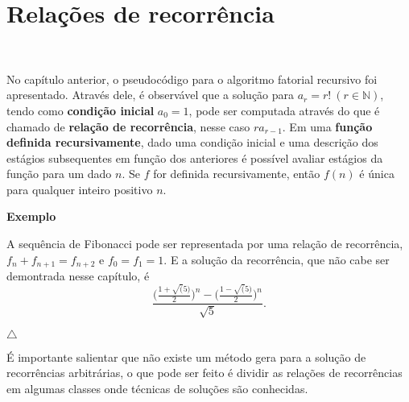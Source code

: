 \section{Relações de recorrência}
\

No capítulo anterior, o pseudocódigo para o algoritmo fatorial recursivo foi apresentado. Através dele, é observável que a solução para $a_r = r! \ (r \in \mathbb{N})$, tendo como \textbf{condição inicial} $a_0 = 1$, pode ser computada através do que é chamado de \textbf{relação de recorrência}, nesse caso $ra_{r-1}$. Em uma \textbf{função definida recursivamente}, dado uma condição inicial e uma descrição dos estágios subsequentes em função dos anteriores é possível avaliar estágios da função para um dado $n$. Se $f$ for definida recursivamente, então $f(n)$ é única para qualquer inteiro positivo $n$.

\textbf{Exemplo}

A sequência de Fibonacci pode ser representada por uma relação de recorrência, $f_{n}+f_{n+1}=f_{n+2}$ e $f_0=f_1=1$. E a solução da recorrência, que não cabe ser demontrada nesse capítulo, é
\[\frac{\Bigr(\frac{1+\sqrt(5)}{2}\Bigr)^n-\Bigr(\frac{1-\sqrt(5)}{2}\Bigr)^n}{\sqrt{5}}.\]

{\raggedleft $\bigtriangleup$ \par}

É importante salientar que não existe um método gera para a solução de recorrências arbitrárias, o que pode ser feito é dividir as relações de recorrências em algumas classes onde técnicas de soluções são conhecidas.